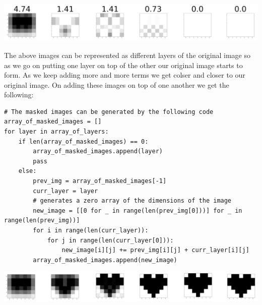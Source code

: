 \documentclass{article}
\begin{document}
\begin{center}
    \includegraphics[width=16.5cm]{components.png}
\end{center}

The above images can be represented as different layers of the original image so as we go on putting one layer on top of the other our original image starts to form. As we keep adding more and more terms we get colser and closer to our original image. On adding these images on top of one another we get the following:

\begin{verbatim}
# The masked images can be generated by the following code
array_of_masked_images = []
for layer in array_of_layers:
    if len(array_of_masked_images) == 0:
        array_of_masked_images.append(layer)
        pass
    else:
        prev_img = array_of_masked_images[-1]
        curr_layer = layer
        # generates a zero array of the dimensions of the image
        new_image = [[0 for _ in range(len(prev_img[0]))] for _ in range(len(prev_img))]
        for i in range(len(curr_layer)):
            for j in range(len(curr_layer[0])):
                new_image[i][j] += prev_img[i][j] + curr_layer[i][j]
        array_of_masked_images.append(new_image)
\end{verbatim}

\begin{center}
    \includegraphics[width=16.5cm]{masked_images.png}
\end{center}
\end{document}
